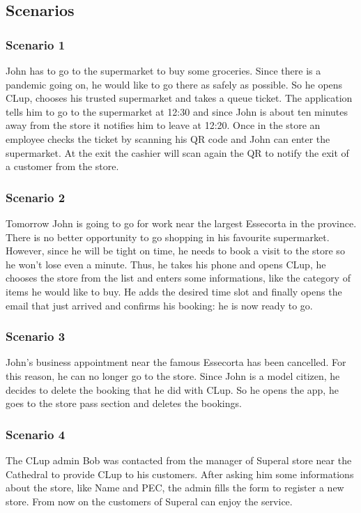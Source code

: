 	\clearpage


\subsection{Scenarios}

\subsubsection{Scenario 1}\label{sc:first}
John has to go to the supermarket to buy some groceries. Since there is a pandemic going on, he would like to go there as safely as possible.\newline
So he opens CLup, chooses his trusted supermarket and takes a queue ticket. The application tells him to go to the supermarket at 12:30 and since John is about ten minutes away from the store it notifies him to leave at 12:20. Once in the store an employee checks the ticket by scanning his QR code and John can enter the supermarket.
At the exit the cashier will scan again the QR to notify the exit of a customer from the store.

\subsubsection{Scenario 2}\label{sc:second}
Tomorrow John is going to go for work near the largest Essecorta in the province. There is no better opportunity to go shopping in his favourite supermarket.\newline
However, since he will be tight on time, he needs to book a visit to the store so he won't lose even a minute. Thus, he takes his phone and opens CLup, he chooses the store from the list and enters some informations, like the category of items he would like to buy. He adds the desired time slot and finally opens the email that just arrived and confirms his booking: he is now ready to go.

\subsubsection{Scenario 3}\label{sc:third}
John's business appointment near the famous Essecorta has been cancelled. For this reason, he can no longer go to the store.\newline
Since John is a model citizen, he decides to delete the booking that he did with CLup. So he opens the app, he goes to the store pass section and deletes the bookings.

\subsubsection{Scenario 4}\label{sc:fourth}
The CLup admin Bob was contacted from the manager of Superal store near the Cathedral to provide CLup to his customers. After asking him some informations about the store, like Name and PEC, the admin fills the form to register a new store. From now on the customers of Superal can enjoy the service.

